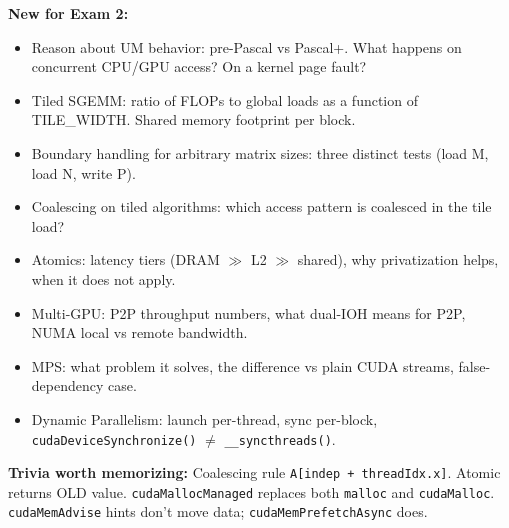 \documentclass[10pt]{article}
\begin{document}
\textbf{New for Exam 2:}
\begin{itemize}
  \item Reason about UM behavior: pre-Pascal vs Pascal+. What happens on concurrent CPU/GPU access? On a kernel page fault?
  \item Tiled SGEMM: ratio of FLOPs to global loads as a function of TILE\_WIDTH. Shared memory footprint per block.
  \item Boundary handling for arbitrary matrix sizes: three distinct tests (load M, load N, write P).
  \item Coalescing on tiled algorithms: which access pattern is coalesced in the tile load?
  \item Atomics: latency tiers (DRAM $\gg$ L2 $\gg$ shared), why privatization helps, when it does not apply.
  \item Multi-GPU: P2P throughput numbers, what dual-IOH means for P2P, NUMA local vs remote bandwidth.
  \item MPS: what problem it solves, the difference vs plain CUDA streams, false-dependency case.
  \item Dynamic Parallelism: launch per-thread, sync per-block, \texttt{cudaDeviceSynchronize()} $\neq$ \texttt{\_\_syncthreads()}.
\end{itemize}

\textbf{Trivia worth memorizing:}
Coalescing rule \texttt{A[indep + threadIdx.x]}. Atomic returns OLD value. \texttt{cudaMallocManaged} replaces both \texttt{malloc} and \texttt{cudaMalloc}. \texttt{cudaMemAdvise} hints don't move data; \texttt{cudaMemPrefetchAsync} does.
\end{document}
